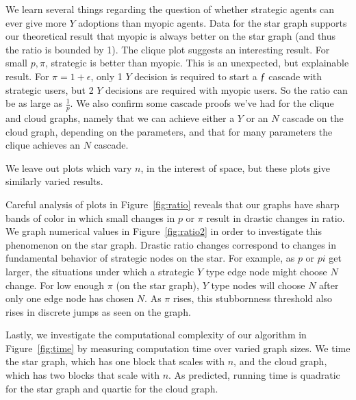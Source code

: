 \documentclass{article}
\begin{document}
We learn several things regarding the question of whether strategic agents can ever give more $Y$ adoptions than myopic agents. Data for the star graph supports our theoretical result that myopic is always better on the star graph (and thus the ratio is bounded by 1). The clique plot suggests an interesting result. For small $p, \pi$, strategic is better than myopic. This is an unexpected, but explainable result. For $\pi=1+\epsilon$, only 1 $Y$ decision is required to start a $ƒ$ cascade with strategic users, but 2 $Y$ decisions are required with myopic users. So the ratio can be as large as $\frac{1}{p}$. We also confirm some cascade proofs we've had for the clique and cloud graphs, namely that we can achieve either a $Y$ or an $N$ cascade on the cloud graph, depending on the parameters, and that for many parameters the clique achieves an $N$ cascade.

We leave out plots which vary $n$, in the interest of space, but these plots give similarly varied results.

Careful analysis of plots in Figure~\ref{fig:ratio} reveals that our graphs have sharp bands of color in which small changes in $p$ or $\pi$ result in drastic changes in ratio. We graph numerical values in Figure~\ref{fig:ratio2} in order to investigate this phenomenon on the star graph. Drastic ratio changes correspond to changes in fundamental behavior of strategic nodes on the star. For example, as $p$ or $pi$ get larger, the situations under which a strategic $Y$ type edge node might choose $N$ change. For low enough $\pi$ (on the star graph), $Y$ type nodes will choose $N$ after only one edge node has chosen $N$. As $\pi$ rises, this stubbornness threshold also rises in discrete jumps as seen on the graph.

Lastly, we investigate the computational complexity of our algorithm in Figure~\ref{fig:time} by measuring computation time over varied graph sizes. We time the star graph, which has one block that scales with $n$, and the cloud graph, which has two blocks that scale with $n$. As predicted, running time is quadratic for the star graph and quartic for the cloud graph.
\end{document}
